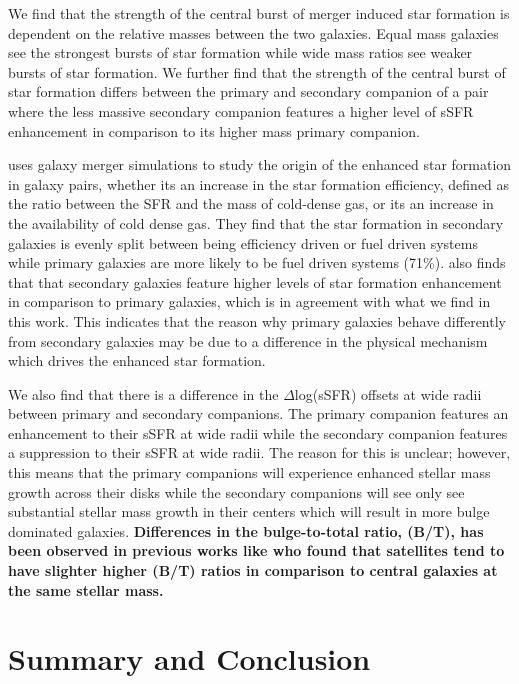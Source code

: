 \documentclass[apj,twocolumn]{emulateapj}
\begin{document}
\begin{CJK*}{UTF8}{gbsn}
We find that the strength of the central burst of merger induced star formation is dependent on the relative masses between the two galaxies. Equal mass galaxies see the strongest bursts of star formation while wide mass ratios see weaker bursts of star formation. We further find that the strength of the central burst of star formation differs between the primary and secondary companion of a pair where the less massive secondary companion features a higher level of sSFR enhancement in comparison to its higher mass primary companion. 

\citet{Moreno:2020} uses galaxy merger simulations to study the origin of the enhanced star formation in galaxy pairs, whether its an increase in the star formation efficiency, defined as the ratio between the SFR and the mass of cold-dense gas, or its an increase in the availability of cold dense gas. They find that the star formation in secondary galaxies is evenly split between being efficiency driven or fuel driven systems while primary galaxies are more likely to be fuel driven systems (71\%). \citet{Moreno:2020} also finds that that secondary galaxies feature higher levels of star formation enhancement in comparison to primary galaxies, which is in agreement with what we find in this work. This indicates that the reason why primary galaxies behave differently from secondary galaxies may be due to a difference in the physical mechanism which drives the enhanced star formation. 

We also find that there is a difference in the $\Delta$log(sSFR) offsets at wide radii between primary and secondary companions. The primary companion features an enhancement to their sSFR at wide radii while the secondary companion features a suppression to their sSFR at wide radii. The reason for this is unclear; however, this means that the primary companions will experience enhanced stellar mass growth across their disks while the secondary companions will see only see substantial stellar mass growth in their centers which will result in more bulge dominated galaxies. {\bf Differences in the bulge-to-total ratio, (B/T), has been observed in previous works like \citet{Bluck:2019} who found that satellites tend to have slighter higher (B/T) ratios in comparison to central galaxies at the same stellar mass.} 


\section{Summary and Conclusion}\label{sec:sum}


\end{CJK*}
\end{document}
